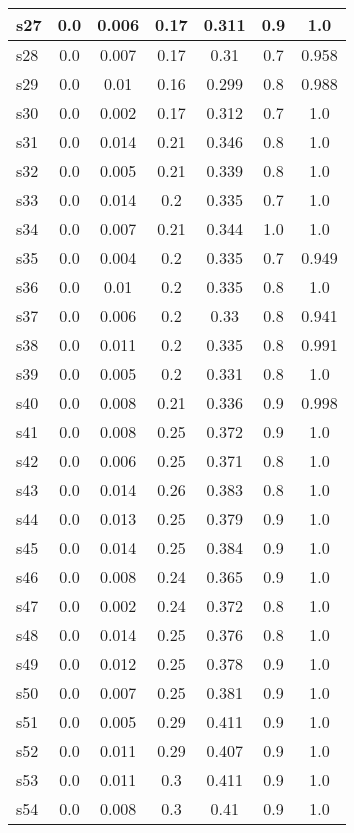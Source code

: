 \documentclass{article}
\begin{document}
\begin{tabular}{|l|c|c|c|c|c|c|}
\hline
s27 &0.0 & 0.006 & 0.17 & 0.311 & 0.9 & 1.0\\
\hline
s28 &0.0 & 0.007 & 0.17 & 0.31 & 0.7 & 0.958\\
\hline
s29 &0.0 & 0.01 & 0.16 & 0.299 & 0.8 & 0.988\\
\hline
s30 &0.0 & 0.002 & 0.17 & 0.312 & 0.7 & 1.0\\
\hline
s31 &0.0 & 0.014 & 0.21 & 0.346 & 0.8 & 1.0\\
\hline
s32 &0.0 & 0.005 & 0.21 & 0.339 & 0.8 & 1.0\\
\hline
s33 &0.0 & 0.014 & 0.2 & 0.335 & 0.7 & 1.0\\
\hline
s34 &0.0 & 0.007 & 0.21 & 0.344 & 1.0 & 1.0\\
\hline
s35 &0.0 & 0.004 & 0.2 & 0.335 & 0.7 & 0.949\\
\hline
s36 &0.0 & 0.01 & 0.2 & 0.335 & 0.8 & 1.0\\
\hline
s37 &0.0 & 0.006 & 0.2 & 0.33 & 0.8 & 0.941\\
\hline
s38 &0.0 & 0.011 & 0.2 & 0.335 & 0.8 & 0.991\\
\hline
s39 &0.0 & 0.005 & 0.2 & 0.331 & 0.8 & 1.0\\
\hline
s40 &0.0 & 0.008 & 0.21 & 0.336 & 0.9 & 0.998\\
\hline
s41 &0.0 & 0.008 & 0.25 & 0.372 & 0.9 & 1.0\\
\hline
s42 &0.0 & 0.006 & 0.25 & 0.371 & 0.8 & 1.0\\
\hline
s43 &0.0 & 0.014 & 0.26 & 0.383 & 0.8 & 1.0\\
\hline
s44 &0.0 & 0.013 & 0.25 & 0.379 & 0.9 & 1.0\\
\hline
s45 &0.0 & 0.014 & 0.25 & 0.384 & 0.9 & 1.0\\
\hline
s46 &0.0 & 0.008 & 0.24 & 0.365 & 0.9 & 1.0\\
\hline
s47 &0.0 & 0.002 & 0.24 & 0.372 & 0.8 & 1.0\\
\hline
s48 &0.0 & 0.014 & 0.25 & 0.376 & 0.8 & 1.0\\
\hline
s49 &0.0 & 0.012 & 0.25 & 0.378 & 0.9 & 1.0\\
\hline
s50 &0.0 & 0.007 & 0.25 & 0.381 & 0.9 & 1.0\\
\hline
s51 &0.0 & 0.005 & 0.29 & 0.411 & 0.9 & 1.0\\
\hline
s52 &0.0 & 0.011 & 0.29 & 0.407 & 0.9 & 1.0\\
\hline
s53 &0.0 & 0.011 & 0.3 & 0.411 & 0.9 & 1.0\\
\hline
s54 &0.0 & 0.008 & 0.3 & 0.41 & 0.9 & 1.0\\

\end{tabular}
\end{document}

